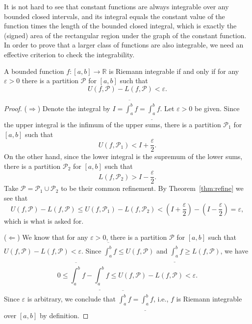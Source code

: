 It is not hard to see that constant functions are always integrable over any bounded closed intervals, and its integral equals the constant value of the function times the length of the bounded closed integral, which is exactly the (signed) area of the rectangular region under the graph of the constant function.
In order to prove that a larger class of functions are also integrable, we need an effective criterion to check the integrability.

\begin{thm}
  \label{thm:riemann-integrable-cauchy-criterion}
  A bounded function $f : [a,b] \to \mathbb{R}$ is Riemann integrable if and only if for any $\varepsilon > 0$ there is a partition $\mathcal{P}$ for $[a,b]$ such that
  \begin{equation}
    \label{eq:riemann-cauchy-criterion}
    U(f,\mathcal{P}) - L(f,\mathcal{P}) < \varepsilon.
  \end{equation}
\end{thm}

\begin{proof}
  ($\Longrightarrow$) 
  Denote the integral by $I = \overline{\int_a^b} f = \underline{\int_a^b} f$.
  Let $\varepsilon > 0$ be given. 
  Since the upper integral is the infimum of the upper sums, there is a partition $\mathcal{P}_1$ for $[a,b]$ such that
  \[
    U(f,\mathcal{P}_1) < I + \frac{\varepsilon}{2}.
  \]
  On the other hand, since the lower integral is the supremum of the lower sums, there is a partition $\mathcal{P}_2$ for $[a,b]$ such that
  \[
    L(f,\mathcal{P}_2) > I - \frac{\varepsilon}{2}.
  \]
  Take $\mathcal{P} = \mathcal{P}_1 \cup \mathcal{P}_2$ to be their common refinement.  By Theorem~\ref{thm:refine} we see that
  \[
    U(f,\mathcal{P}) - L(f,\mathcal{P}) \leqslant U(f,\mathcal{P}_1) - L(f,\mathcal{P}_2) < \left( I + \frac{\varepsilon}{2} \right) - \left( I - \frac{\varepsilon}{2} \right) = \varepsilon,
  \]
  which is what is asked for.
  
  ($\Longleftarrow$) We know that for any $\varepsilon > 0$, there is a partition $\mathcal{P}$ for $[a,b]$ such that $U(f,\mathcal{P}) - L(f,\mathcal{P}) < \varepsilon$.
  Since $\overline{\int_a^b} f \leqslant U(f,\mathcal{P})$ and $\underline{\int_a^b} f \geqslant L(f,\mathcal{P})$, we have
  \[
    0 \leqslant \overline{\int_a^b} f - \underline{\int_a^b} f \leqslant U(f,\mathcal{P}) - L(f,\mathcal{P}) < \varepsilon.
  \]
  Since $\varepsilon$ is arbitrary, we conclude that $\overline{\int_a^b} f = \underline{\int_a^b} f$, i.e., $f$ is Riemann integrable over $[a,b]$ by definition.
\end{proof}

